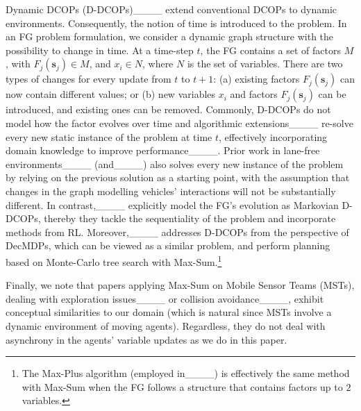 Dynamic DCOPs (D-DCOPs)____ extend conventional DCOPs to dynamic environments. 
Consequently, the notion of time is introduced to the problem. In an FG problem formulation, we consider a dynamic graph structure with the possibility to change in time. 
At a time-step $t$, the FG contains a set of factors $M$, with $F_j(\mathbf{s}_j) \in M$, and $x_i \in N$, where $N$ is the set of variables.
There are two types of changes for every update from $t$ to $t+1$: (a) existing factors $F_j(\mathbf{s}_j)$ can now contain different values; or (b) new variables $x_i$ and factors $F_j(\mathbf{s}_j)$ can be introduced, and existing ones can be removed.
Commonly, D-DCOPs do not model how the factor evolves over time and algorithmic extensions____ re-solve every new static instance of the problem at time $t$, effectively incorporating domain knowledge to improve performance____.
Prior work in lane-free environments____ (and____) also solves every new instance of the problem by relying on the previous solution as a starting point, with the assumption that changes in the graph modelling vehicles' interactions will not be substantially different.
In contrast,____ explicitly model the FG's evolution as Markovian D-DCOPs, thereby they tackle the sequentiality of the problem and incorporate methods from RL.
Moreover,____ addresses D-DCOPs from the perspective of DecMDPs, which can be viewed as a similar problem, and perform planning based on Monte-Carlo tree search with Max-Sum.\footnote{The Max-Plus algorithm (employed in____) is effectively the same method with Max-Sum when the FG follows a structure that contains factors up to $2$ variables.}

Finally, we note that papers applying Max-Sum on Mobile Sensor Teams (MSTs), dealing with exploration issues____ or collision avoidance____, exhibit conceptual similarities to our domain (which is natural since MSTs involve a dynamic environment of moving agents).
Regardless, they do not deal with asynchrony in the agents' variable updates as we do in this paper.






